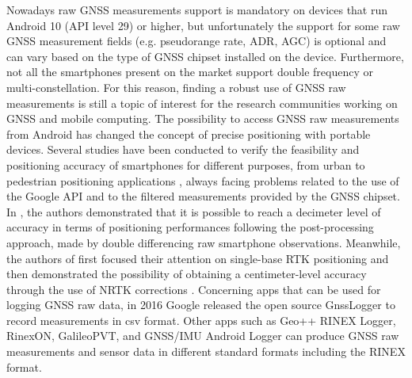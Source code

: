 Nowadays raw GNSS measurements support is mandatory on devices that run Android 10 (API level 29) or higher, but unfortunately the support for some raw GNSS measurement fields (e.g. pseudorange rate, ADR, AGC) is optional and can vary based on the type of GNSS chipset installed on the device. Furthermore, not all the smartphones present on the market support double frequency or multi-constellation.
For this reason, finding a robust use of GNSS raw measurements is still a topic of interest for the research communities working on GNSS and mobile computing.
%
The possibility to access GNSS raw measurements from Android  has changed the concept of precise positioning with portable devices. Several studies have been conducted to verify the feasibility \cite{Humphreys:2016} and positioning accuracy \cite{Pesyna2014, Zhang:2018} of smartphones for different purposes, from urban \cite{Masiero2014, adjrad2018} to pedestrian positioning applications
\cite{presti2017, Fissore2018}, always facing problems related to the use of the Google API and to the filtered measurements provided by the GNSS chipset.
In \cite{realini2017}, the authors demonstrated that it is possible to reach a decimeter level of accuracy
in terms of positioning performances following the post-processing approach, made by
double differencing raw smartphone observations. Meanwhile, the authors of \cite{Dabove2019b} first focused
their attention on single-base RTK positioning and then demonstrated the possibility
of obtaining a centimeter-level accuracy through the use of NRTK corrections \cite{Dabove:2019}.
%
Concerning  apps that can be used for logging GNSS raw data, 
in 2016 Google released the open source GnssLogger to record measurements in csv format.
Other apps such as  Geo++ RINEX Logger,  RinexON, GalileoPVT, and GNSS/IMU Android Logger can produce  GNSS raw measurements and sensor data in different standard formats including the 
RINEX format.

